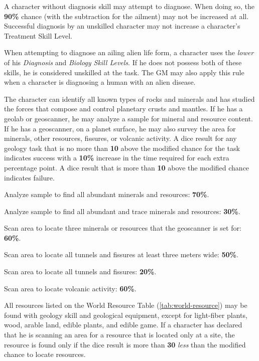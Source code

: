 A character without diagnosis skill may attempt to diagnose.  When
doing so, the \textbf{90\%} chance (with the subtraction for the
ailment) may not be increased at all.  Successful diagnosis by an
unskilled character may not increase a character's Treatment Skill
Level.

When attempting to diagnose an ailing alien life form, a character
uses the \emph{lower} of his \emph{Diagnosis} and \emph{Biology Skill
  Levels}.  If he does not possess both of these skills, he is
considered unskilled at the task.  The GM may also apply this rule when
a character is diagnosing a human with an alien disease.

\label{sec:skill-geology}

The character can identify all known types of rocks and minerals and
has studied the forces that compose and control planetary crusts and
mantles.  If he has a geolab or geoscanner, he may analyze a sample for
mineral and resource content.  If he has a geoscanner, on a planet
surface, he may also survey the area for minerals, other resources,
fissures, or volcanic activity.  A dice result for any geology task
that is no more than \textbf{10} above the modified chance for the
task indicates success with a \textbf{10\%} increase in the time
required for each extra percentage point.  A dice result that is more
than \textbf{10} above the modified chance indicates failure.

\begin{tasklist}
\item Analyze sample to find all abundant minerals and resources:
  \textbf{70\%}.
\item Analyze sample to find all abundant and trace minerals and
  resources: \textbf{30\%}.
\item Scan area to locate three minerals or resources that the
  geoscanner is set for: \textbf{60\%}.
\item Scan area to locate all tunnels and fissures at least three
  meters wide: \textbf{50\%}.
\item Scan area to locate all tunnels and fissures: \textbf{20\%}.
\item Scan area to locate volcanic activity: \textbf{60\%}.
\end{tasklist}

All resources listed on the World Resource Table
(\ref{tab:world-resource}) may be found with geology skill and
geological equipment, except for light-fiber plants, wood, arable
land, edible plants, and edible game.  If a character has declared
that he is scanning an area for a resource that is located only at a
site, the resource is found only if the dice result is more than
\textbf{30} \emph{less} than the modified chance to locate resources.

